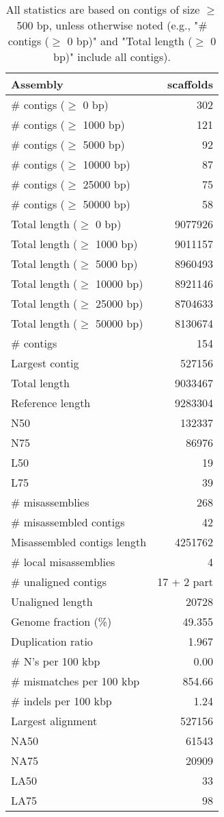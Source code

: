 \documentclass[12pt,a4paper]{article}
\begin{document}
\begin{table}[ht]
\begin{center}
\caption{All statistics are based on contigs of size $\geq$ 500 bp, unless otherwise noted (e.g., "\# contigs ($\geq$ 0 bp)" and "Total length ($\geq$ 0 bp)" include all contigs).}
\begin{tabular}{|l*{1}{|r}|}
\hline
Assembly & scaffolds \\ \hline
\# contigs ($\geq$ 0 bp) & 302 \\ \hline
\# contigs ($\geq$ 1000 bp) & 121 \\ \hline
\# contigs ($\geq$ 5000 bp) & 92 \\ \hline
\# contigs ($\geq$ 10000 bp) & 87 \\ \hline
\# contigs ($\geq$ 25000 bp) & 75 \\ \hline
\# contigs ($\geq$ 50000 bp) & 58 \\ \hline
Total length ($\geq$ 0 bp) & 9077926 \\ \hline
Total length ($\geq$ 1000 bp) & 9011157 \\ \hline
Total length ($\geq$ 5000 bp) & 8960493 \\ \hline
Total length ($\geq$ 10000 bp) & 8921146 \\ \hline
Total length ($\geq$ 25000 bp) & 8704633 \\ \hline
Total length ($\geq$ 50000 bp) & 8130674 \\ \hline
\# contigs & 154 \\ \hline
Largest contig & 527156 \\ \hline
Total length & 9033467 \\ \hline
Reference length & 9283304 \\ \hline
N50 & 132337 \\ \hline
N75 & 86976 \\ \hline
L50 & 19 \\ \hline
L75 & 39 \\ \hline
\# misassemblies & 268 \\ \hline
\# misassembled contigs & 42 \\ \hline
Misassembled contigs length & 4251762 \\ \hline
\# local misassemblies & 4 \\ \hline
\# unaligned contigs & 17 + 2 part \\ \hline
Unaligned length & 20728 \\ \hline
Genome fraction (\%) & 49.355 \\ \hline
Duplication ratio & 1.967 \\ \hline
\# N's per 100 kbp & 0.00 \\ \hline
\# mismatches per 100 kbp & 854.66 \\ \hline
\# indels per 100 kbp & 1.24 \\ \hline
Largest alignment & 527156 \\ \hline
NA50 & 61543 \\ \hline
NA75 & 20909 \\ \hline
LA50 & 33 \\ \hline
LA75 & 98 \\ \hline
\end{tabular}
\end{center}
\end{table}
\end{document}
